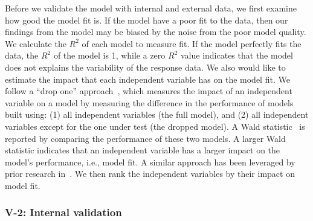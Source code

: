 Before we validate the model with internal and external data, we first examine how good the model fit is. If the model have a poor fit to the data, then our findings from the model may be biased by the noise from the poor model quality. We calculate the $R^2$ of each model to measure fit. If the model perfectly fits the data, the $R^2$ of the model is 1, while a zero $R^2$ value indicates that the model does not explains the variability of the response data. We also would like to estimate the impact that each independent variable has on the model fit. We follow a ``drop one'' approach~\cite{Chambers1990}, which measures the impact of an independent variable on a model by measuring the difference in the performance of models built using: (1) all independent variables (the full model), and (2) all independent variables except for the one under test (the dropped model). A Wald statistic~\cite{harrell2001regression} is reported by comparing the performance of these two models. A larger Wald statistic indicates that an independent variable has a larger impact on the model's performance, i.e., model fit. A similar approach has been leveraged by prior research in~\cite{mcintosh2015emse}. We then rank the independent variables by their impact on model fit. 



\subsubsection{V-2: Internal validation}

